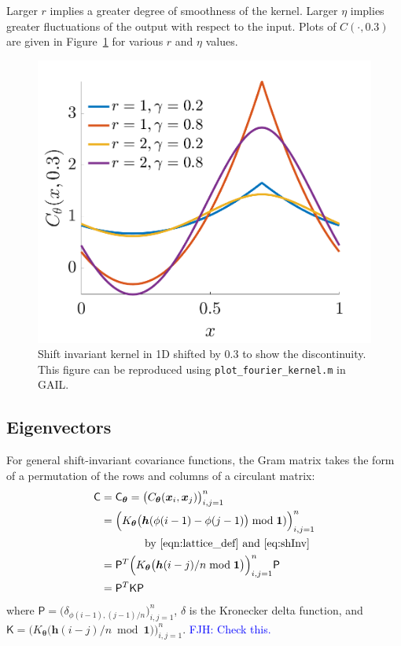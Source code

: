 \documentclass[twocolumn]{svjour3}          %
\newcommand{\bm}[1]{\boldsymbol{#1}}
\newcommand{\vtheta}{{\bm{\theta}}}
\newcommand{\vh}{\bm{h}}
\newcommand{\vx}{\bm{x}}
\newcommand{\vone}{\bm{1}}
\newcommand{\mC}{\mathsf{C}}
\newcommand{\mP}{\mathsf{P}}
\newcommand{\mK}{\mathsf{K}}
\newcommand{\code}[1]{\texttt{#1}}
\newcommand\figref{Figure~\ref}
\newcommand{\FJHNote}[1]{{\textcolor{blue}{FJH: #1}}}
\begin{document}
Larger $r$ implies a greater degree of smoothness of the kernel.  Larger $\eta$ implies greater fluctuations of the output with respect to the input.  Plots of $C(\cdot, 0.3)$ are given in \figref{fig:fourierkernel-dim1} for various $r$ and $\eta$ values.

\begin{figure}
	\centering
	\includegraphics[width=0.9\linewidth]{"fourier_kernel_dim_1"}
	\caption[Fourier kernel]{Shift invariant kernel in 1D shifted by 0.3 to show the discontinuity. This figure can be reproduced using \code{plot\_fourier\_kernel.m} in GAIL. }
	\label{fig:fourierkernel-dim1}
\end{figure}

\subsection{Eigenvectors}
For general shift-invariant covariance functions, the Gram matrix takes the form of a permutation of the rows and columns of a circulant matrix:
\begin{align*}
\mC &= \mC_\vtheta = \bigl ( C_\vtheta(\vx_i, \vx_j) \bigr)_{i, j = 1}^n \\
& = \Bigl ( K_\vtheta \bigl(\vh(\phi(i-1) - \phi(j-1) \bigr) \bmod \vone ) \Bigr)_{i, j = 1}^n \\
& \qquad \qquad  \text{by \eqref{eqn:lattice_def} and \eqref{eq:shInv}}  \\
& = \mP^T \Bigl ( K_\vtheta \bigl (\vh (i-j)/n \bmod \vone \bigr ) \Bigr)_{i, j = 1}^n \mP\\
& = \mP^T \mK \mP
\end{align*}
where $\mP = \bigl( \delta_{\phi(i-1), (j-1)/n}  \bigr)_{i,j=1}^n$, $\delta$ is the Kronecker delta function, and $\mK = \bigl ( K_\vtheta \bigl (\vh (i-j)/n \bmod \vone \bigr ) \bigr)_{i, j = 1}^n$.  \FJHNote{Check this.}
\end{document}
